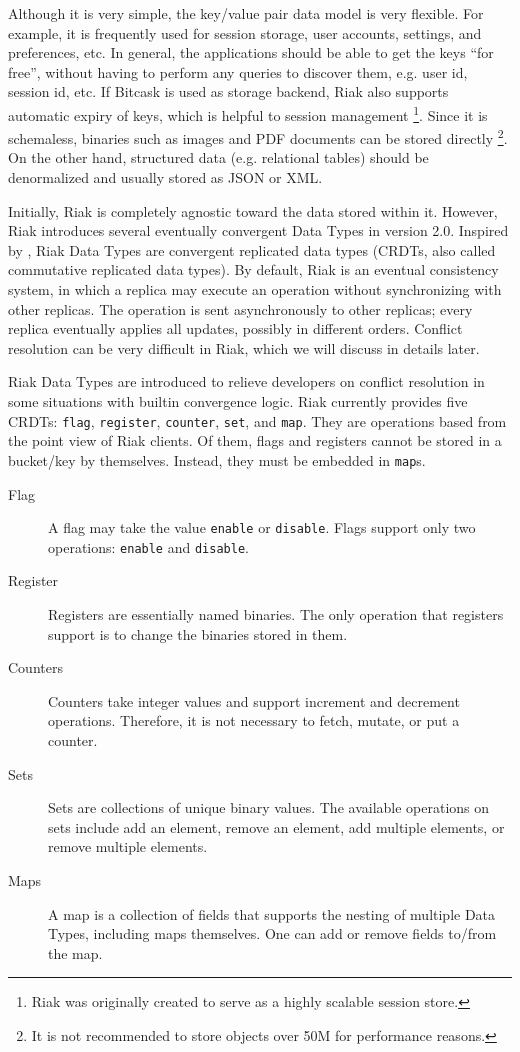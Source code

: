 \documentclass[11pt]{book}
\begin{document}
Although it is very simple, the key/value pair data model is very flexible. For example, it is frequently used for session storage, user accounts, settings, and preferences, etc. In general, the applications should be able to get the keys ``for free'', without having to perform any queries to discover them, e.g. user id, session id, etc. If Bitcask is used as storage backend, Riak also supports automatic expiry of keys, which is helpful to session management \footnote{Riak was originally created to serve as a highly scalable session store.}. Since it is schemaless, binaries such as images and PDF documents can be stored directly \footnote{It is not recommended to store objects over 50M for performance reasons.}. On the other hand, structured data (e.g. relational tables) should be denormalized and usually stored as JSON or XML.

Initially, Riak is completely agnostic toward the data stored within it. However, Riak introduces several eventually convergent Data Types in version 2.0. Inspired by \cite{CRDT2011}, Riak Data Types are convergent replicated data types (CRDTs, also called commutative replicated data types). By default, Riak is an eventual consistency system, in which a replica may execute an operation without synchronizing with other replicas. The operation is sent asynchronously to other replicas; every replica eventually applies all updates, possibly in different orders. Conflict resolution can be very difficult in Riak, which we will discuss in details later.

Riak Data Types are introduced to relieve developers on conflict resolution in some situations with builtin convergence logic. Riak currently provides five CRDTs: \texttt{flag}, \texttt{register}, \texttt{counter}, \texttt{set}, and \texttt{map}. They are operations based from the point view of Riak clients. Of them, flags and registers cannot be stored in a bucket/key by themselves. Instead, they must be embedded in \texttt{map}s.

\begin{description}
\item[Flag]
A flag may take the value \texttt{enable} or \texttt{disable}.
Flags support only two operations: \texttt{enable} and \texttt{disable}.

\item[Register]
Registers are essentially named binaries.
The only operation that registers support is to change the binaries stored in them.

\item[Counters]
Counters take integer values and support increment and decrement operations. Therefore, it is not necessary to fetch, mutate, or put a counter.

\item[Sets]
Sets are collections of unique binary values.
The available operations on sets include add an element, remove an element, add multiple elements, or remove multiple elements.

\item[Maps]
A map is a collection of fields that supports the nesting of multiple Data Types, including maps themselves. One can add or remove fields to/from the map.
\end{description}
\end{document}
